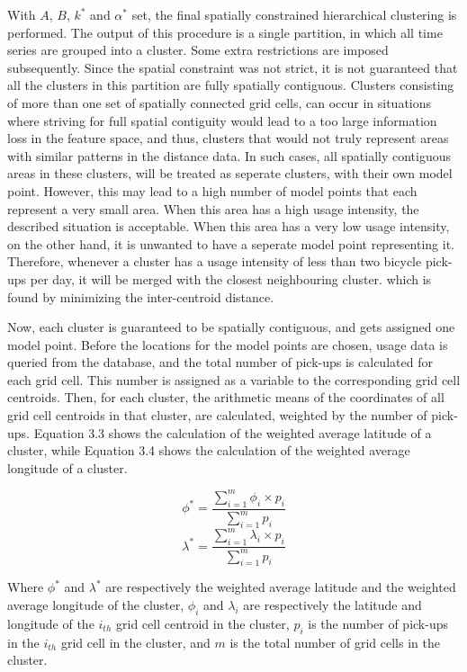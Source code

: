 \documentclass[12pt,oneside]{reedthesis}
\begin{document}
With \(A\), \(B\), \(k^{*}\) and \(\alpha^{*}\) set, the final spatially
constrained hierarchical clustering is performed. The output of this
procedure is a single partition, in which all time series are grouped
into a cluster. Some extra restrictions are imposed subsequently. Since
the spatial constraint was not strict, it is not guaranteed that all the
clusters in this partition are fully spatially contiguous. Clusters
consisting of more than one set of spatially connected grid cells, can
occur in situations where striving for full spatial contiguity would
lead to a too large information loss in the feature space, and thus,
clusters that would not truly represent areas with similar patterns in
the distance data. In such cases, all spatially contiguous areas in
these clusters, will be treated as seperate clusters, with their own
model point. However, this may lead to a high number of model points
that each represent a very small area. When this area has a high usage
intensity, the described situation is acceptable. When this area has a
very low usage intensity, on the other hand, it is unwanted to have a
seperate model point representing it. Therefore, whenever a cluster has
a usage intensity of less than two bicycle pick-ups per day, it will be
merged with the closest neighbouring cluster. which is found by
minimizing the inter-centroid distance.

Now, each cluster is guaranteed to be spatially contiguous, and gets
assigned one model point. Before the locations for the model points are
chosen, usage data is queried from the database, and the total number of
pick-ups is calculated for each grid cell. This number is assigned as a
variable to the corresponding grid cell centroids. Then, for each
cluster, the arithmetic means of the coordinates of all grid cell
centroids in that cluster, are calculated, weighted by the number of
pick-ups. Equation 3.3 shows the calculation of the weighted average
latitude of a cluster, while Equation 3.4 shows the calculation of the
weighted average longitude of a cluster.

\[ \phi^{*} = \frac{\sum_{i=1}^{m} \phi_{i} \times p_{i}}{\sum_{i=1}^{m} p_{i}} \]
\[ \lambda^{*} = \frac{\sum_{i=1}^{m} \lambda_{i} \times p_{i}}{\sum_{i=1}^{m} p_{i}} \]

Where \(\phi^{*}\) and \(\lambda^{*}\) are respectively the weighted
average latitude and the weighted average longitude of the cluster,
\(\phi_i\) and \(\lambda_{i}\) are respectively the latitude and
longitude of the \(i_{th}\) grid cell centroid in the cluster, \(p_{i}\)
is the number of pick-ups in the \(i_{th}\) grid cell in the cluster,
and \(m\) is the total number of grid cells in the cluster.
\end{document}

